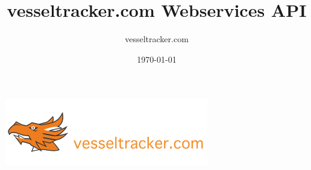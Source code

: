 \documentclass[a4paper]{article}
\begin{document}
\title{vesseltracker.com Webservices API}
\author{vesseltracker.com}
\date{\today}
\maketitle
\includegraphics{images/vesseltracker_logo}
\thispagestyle{empty}
\newpage
\setcounter{page}{1}
\tableofcontents
\newpage


\end{document}
